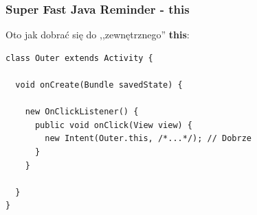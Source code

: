 \documentclass{beamer}
\begin{document}
\begin{frame}[fragile]\frametitle{Super Fast Java Reminder - \textbf{this}}
Oto jak dobrać się do ,,zewnętrznego'' \textbf{this}:
\begin{lstlisting}
class Outer extends Activity { 

  void onCreate(Bundle savedState) {

    new OnClickListener() {
      public void onClick(View view) {
        new Intent(Outer.this, /*...*/); // Dobrze
      }
    }

  }
}
\end{lstlisting}
\end{frame}
\end{document}
